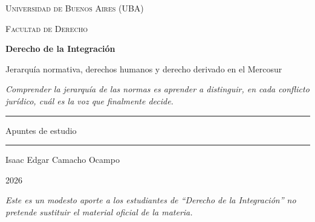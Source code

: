 \documentclass[12pt,oneside]{book}
\newcommand{\universidad}{Universidad de Buenos Aires (UBA)}
\newcommand{\facultad}{Facultad de Derecho}
\newcommand{\materia}{Derecho de la Integración}
\newcommand{\titulo}{Jerarquía normativa, derechos humanos y derecho derivado en el Mercosur}
\newcommand{\autor}{Isaac Edgar Camacho Ocampo}
\newcommand{\anio}{2026}
\begin{document}
\begin{titlepage}

\thispagestyle{empty}

\begin{center}

\vspace*{1cm}

{\large \textsc{\universidad}}

\vspace{0.2cm}

{\large \textsc{\facultad}}

\vspace{3cm}

{\Huge \textbf{\materia}}

\vspace{1cm}

{\LARGE \titulo}

\vspace{0.8cm}

\textit{Comprender la jerarquía de las normas es aprender a distinguir, en cada conflicto jurídico, cuál es la voz que finalmente decide.}

\vspace{1.2cm}

\rule{0.70\textwidth}{0.5pt}

\vspace{0.5cm}

{\large Apuntes de estudio}

\vspace{0.5cm}

\rule{0.70\textwidth}{0.5pt}

\vfill

{\large \autor}

\vspace{0.3cm}

{\large \anio}

\end{center}

\vfill

\begin{flushleft}
\textit{Este es un modesto aporte a los estudiantes de ``Derecho de la Integración'' no pretende sustituir el material oficial de la materia.}
\end{flushleft}

\end{titlepage}
\end{document}

